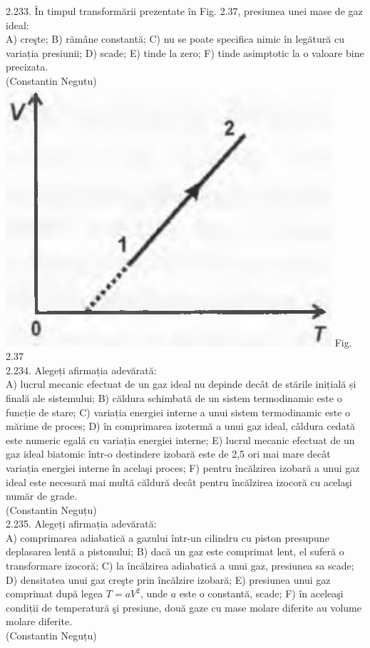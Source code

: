 2.233. În timpul transformării prezentate în Fig. 2.37, presiunea unei mase de gaz ideal:\\ A) creşte; B) rămâne constantă; C) nu se poate specifica nimic în legătură cu variația presiunii; D) scade; E) tinde la zero; F) tinde asimptotic la o valoare bine precizata.\\ (Constantin Negutu)\\ \includegraphics[width=0.4\linewidth]{images/2025_07_01_5b3ff9fa0d508c8e9f17g-126} Fig. 2.37\\

2.234. Alegeți afirmația adevărată:\\ A) lucrul mecanic efectuat de un gaz ideal nu depinde decât de stările inițială și finală ale sistemului; B) căldura schimbată de un sistem termodinamic este o funcție de stare; C) variația energiei interne a unui sistem termodinamic este o mărime de proces; D) în comprimarea izotermă a unui gaz ideal, cǎldura cedată este numeric egală cu variația energiei interne; E) lucrul mecanic efectuat de un gaz ideal biatomic într-o destindere izobară este de 2,5 ori mai mare decât variația energiei interne în acelaşi proces; F) pentru încălzirea izobară a unui gaz ideal este necesară mai multă căldură decât pentru încălzirea izocoră cu acelaşi număr de grade.\\ (Constantin Neguțu)\\

2.235. Alegeți afirmația adevărată:\\ A) comprimarea adiabatică a gazului într-un cilindru cu piston presupune deplasarea lentă a pistonului; B) dacă un gaz este comprimat lent, el suferă o transformare izocoră; C) la încălzirea adiabatică a unui gaz, presiunea sa scade; D) densitatea unui gaz creşte prin încălzire izobară; E) presiunea unui gaz comprimat după legea $T=a V^{2}$, unde $a$ este o constantă, scade; F) în aceleaşi condiții de temperatură şi presiune, două gaze cu mase molare diferite au volume molare diferite.\\ (Constantin Neguțu)\\

